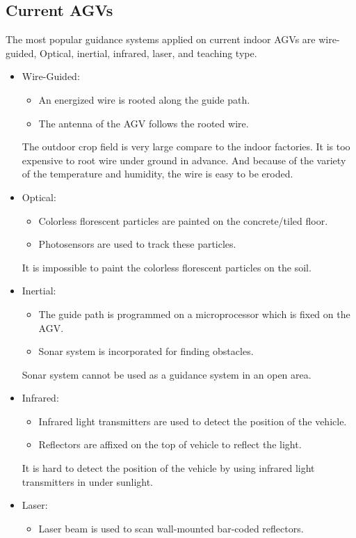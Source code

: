 \documentclass[12pt]{article}
\begin{document}
\begin{flushleft}
\subsection{Current AGVs}
The most popular guidance systems applied on current indoor AGVs are wire-guided, Optical, inertial, infrared, laser, and teaching type. \cite{KESH}
\begin{itemize}
	\item Wire-Guided:
	\begin{itemize}
		\item An energized wire is rooted along the guide path. 
		\item The antenna of the AGV follows the rooted wire.
	\end{itemize}
	The outdoor crop field is very large compare to the indoor factories. It is too expensive to root wire under ground in advance. And because of the variety of the temperature and humidity, the wire is easy to be eroded.
	\item Optical:
	\begin{itemize}
		\item Colorless florescent particles are painted on the concrete/tiled floor. 
		\item Photosensors are used to track these particles.
	\end{itemize}
	It is impossible to paint the colorless florescent particles on the soil.
	\item Inertial:
	\begin{itemize}
		\item The guide path is programmed on a microprocessor which is fixed on the AGV. 
		\item Sonar system is incorporated for finding obstacles.
	\end{itemize}
	Sonar system cannot be used as a guidance system in an open area.
	\item Infrared:
	\begin{itemize}
		\item Infrared light transmitters are used to detect the position of the vehicle.
		\item Reflectors are affixed on the top of vehicle to reflect the light.
	\end{itemize}
	It is hard to detect the position of the vehicle by using infrared light transmitters in under sunlight.
	\item Laser:
	\begin{itemize}
		\item Laser beam is used to scan wall-mounted bar-coded reflectors.

\end{itemize}
\end{itemize}
\end{flushleft}
\end{document}
